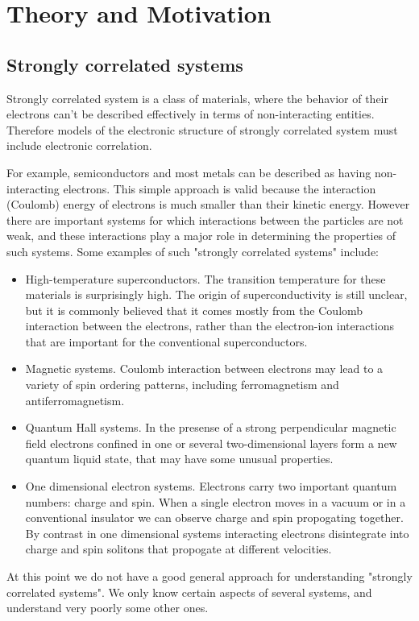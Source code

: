 \section{Theory and Motivation}
\subsection{Strongly correlated systems}
Strongly correlated system is a class of materials, where the behavior of their electrons can't be 
described effectively in terms of non-interacting entities. Therefore models of the electronic
structure of strongly correlated system must include electronic correlation.

For example, semiconductors and most metals can be described as having non-interacting electrons.
This simple approach is valid because the interaction (Coulomb) energy of electrons is much smaller than their kinetic energy.
However there are important systems for which interactions between the particles are not weak,
 and these interactions play a major role in determining the properties of such systems.
Some examples of such "strongly correlated systems" include:
\begin{itemize}
\item
High-temperature superconductors. The transition temperature for these materials is surprisingly high.
The origin of superconductivity is still unclear, but it is commonly believed that it comes mostly from the Coulomb interaction between the electrons,
 rather than the electron-ion interactions that are important for the conventional superconductors.
\item
Magnetic systems. Coulomb interaction between electrons may lead to a variety of spin ordering patterns, including ferromagnetism and antiferromagnetism.
\item
Quantum Hall systems. In the presense of a strong perpendicular magnetic field electrons confined in one or several two-dimensional layers form a new quantum liquid state,
 that may have some unusual properties.
\item
One dimensional electron systems. Electrons carry two important quantum numbers: charge and spin.
When a single electron moves in a vacuum or in a conventional insulator we can observe charge and spin propogating together.
By contrast in one dimensional systems interacting electrons disintegrate into charge and spin solitons that propogate at different velocities.
\end{itemize}
At this point we do not have a good general approach for understanding "strongly correlated systems".
We only know certain aspects of several systems, and understand very poorly some other ones.

